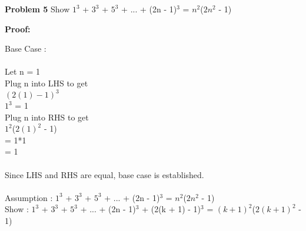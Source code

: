 \documentclass[12pt]{article}
\begin{document}
\par

\par
\bigskip
{\bf Problem
5
}
Show $1^{3}$ + $3^{3}$ + $5^{3}$ + ... + (2n - 1)$^{3}$ = $n^{2}$($2n^{2}$ - 1)



\par
\bigskip
{\bf Proof:}
\par
Base Case : \\
\\
	Let n = 1 \\
	Plug n into LHS to get \\
	$(2(1) - 1)^{3}$ \\
	$1^{3}$ = 1 \\
	Plug n into RHS to get \\
	$1^{2}$($2(1)^{2}$ - 1) \\
	= 1*1\\
	= 1 \\
	\\
Since LHS and RHS are equal, base case is established. \\
\\

Assumption : $1^{3}$ + $3^{3}$ + $5^{3}$ + ... + (2n - 1)$^{3}$ = $n^{2}$($2n^{2}$ - 1) \\
Show : $1^{3}$ + $3^{3}$ + $5^{3}$ + ... + (2n - 1)$^{3}$ + (2(k + 1) - 1)$^{3}$ = $(k + 1)^{2}$($2(k + 1)^{2}$ - 1) \\
\end{document}
